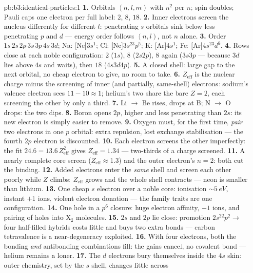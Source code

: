 \begin{solution}{pb:b3:identical-particles:1}
\textbf{1.} Orbitals $(n, l, m)$ with $n^2$ per $n$; spin doubles;
Pauli caps one electron per full label: $2$, $8$, $18$.
\textbf{2.} Inner electrons screen the nucleus differently for
different $l$: penetrating $s$ orbitals sink below less
penetrating $p$ and $d$ --- energy order follows $(n, l)$, not $n$
alone.
\textbf{3.} Order $1s\,2s\,2p\,3s\,3p\,4s\,3d$; Na: [Ne]$3s^1$;
Cl: [Ne]$3s^23p^5$; K: [Ar]$4s^1$; Fe: [Ar]$4s^23d^6$.
\textbf{4.} Rows close at each noble configuration: $2$ ($1s$),
$8$ ($2s2p$), $8$ again ($3s3p$ --- because $3d$ lies above $4s$
and waits), then $18$ ($4s3d4p$).
\textbf{5.} A closed shell: large gap to the next orbital, no
cheap electron to give, no room to take.
\textbf{6.} $Z_{\text{eff}}$ is the nuclear charge minus the
screening of inner (and partially, same-shell) electrons: sodium's
valence electron sees $11 - 10 \approx 1$; helium's two share the
bare $Z = 2$, each screening the other by only a third.
\textbf{7.} Li $\to$ Be rises, drops at B; N $\to$ O drops:
the two dips.
\textbf{8.} Boron opens $2p$, higher and less penetrating than
$2s$: its new electron is simply easier to remove.
\textbf{9.} Oxygen must, for the first time, \emph{pair} two
electrons in one $p$ orbital: extra repulsion, lost exchange
stabilisation --- the fourth $2p$ electron is discounted.
\textbf{10.} Each electron screens the other imperfectly:
the fit $24.6 = 13.6\,Z_{\text{eff}}^2$ gives $Z_{\text{eff}} =
1.34$ --- two-thirds of a charge screened.
\textbf{11.} A nearly complete core screen ($Z_{\text{eff}}
\approx 1.3$) and the outer electron's $n = 2$: both cut the
binding.
\textbf{12.} Added electrons enter the \emph{same} shell and
screen each other poorly while $Z$ climbs: $Z_{\text{eff}}$ grows
and the whole shell contracts --- neon is smaller than lithium.
\textbf{13.} One cheap $s$ electron over a noble core: ionisation
$\sim\qty{5}{eV}$, instant $+1$ ions, violent electron donation
--- the family traits are one configuration.
\textbf{14.} One hole in a $p^6$ closure: huge electron
affinity, $-1$ ions, and pairing of holes into X$_2$ molecules.
\textbf{15.} $2s$ and $2p$ lie close: promotion $2s^22p^2 \to$
four half-filled hybrids costs little and buys two extra bonds ---
carbon tetravalence is a near-degeneracy exploited.
\textbf{16.} With four electrons, both the bonding \emph{and}
antibonding combinations fill: the gains cancel, no covalent
bond --- helium remains a loner.
\textbf{17.} The $d$ electrons bury themselves inside the $4s$
skin: outer chemistry, set by the $s$ shell, changes little across

\end{solution}
